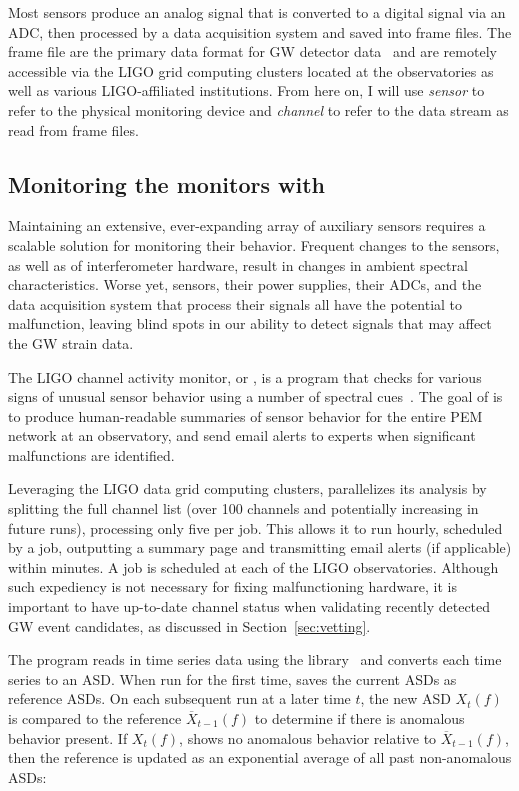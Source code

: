 Most sensors produce an analog signal that is converted to a digital signal via an \ac{ADC}, then processed by a data acquisition system and saved into frame files.
The frame file are the primary data format for \ac{GW} detector data~\citep{frame_file} and are remotely accessible via the \ac{LIGO} grid computing clusters located at the observatories as well as various \ac{LIGO}-affiliated institutions.
From here on, I will use \textit{sensor} to refer to the physical monitoring device and \textit{channel} to refer to the data stream as read from frame files.

\subsection{Monitoring the monitors with \ligocam}\label{sec:ligocam}

Maintaining an extensive, ever-expanding array of auxiliary sensors requires a scalable solution for monitoring their behavior.
Frequent changes to the sensors, as well as of interferometer hardware, result in changes in ambient spectral characteristics.
Worse yet, sensors, their power supplies, their \acp{ADC}, and the data acquisition system that process their signals all have the potential to malfunction, leaving blind spots in our ability to detect signals that may affect the \ac{GW} strain data.

The \ac{LIGO} channel activity monitor, or \ligocam, is a program that checks for various signs of unusual sensor behavior using a number of spectral cues~\citep{ligocam}.
The goal of \ligocam is to produce human-readable summaries of sensor behavior for the entire \ac{PEM} network at an observatory, and send email alerts to experts when significant malfunctions are identified.

Leveraging the \ac{LIGO} data grid computing clusters, \ligocam parallelizes its analysis by splitting the full channel list (over 100 channels and potentially increasing in future runs), processing only five per job.
This allows it to run hourly, scheduled by a  job, outputting a summary page and transmitting email alerts (if applicable) within minutes.
A  job is scheduled at each of the \ac{LIGO} observatories.
Although such expediency is not necessary for fixing malfunctioning hardware, it is important to have up-to-date channel status when validating recently detected \ac{GW} event candidates, as discussed in Section~\ref{sec:vetting}.

The program reads in time series data using the  library~\citep{gwpy} and converts each time series to an \ac{ASD}.
When run for the first time, \ligocam saves the current \acp{ASD} as reference \acp{ASD}.
On each subsequent run at a later time $t$, the new \ac{ASD} $X_t(f)$ is compared to the reference $\overline{X}_{t-1}(f)$ to determine if there is anomalous behavior present.
If $X_t(f)$, shows no anomalous behavior relative to $\overline{X}_{t-1}(f)$, then the reference is updated as an exponential average of all past non-anomalous \acp{ASD}:

